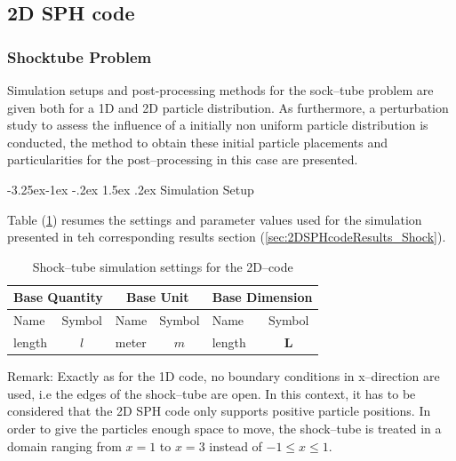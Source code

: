 \documentclass{report}
\makeatletter
\renewcommand\paragraph{\@startsection{paragraph}{4}{\z@}%
  {-3.25ex\@plus -1ex \@minus -.2ex}%
  {1.5ex \@plus .2ex}%
  {\normalfont\normalsize\bfseries}}
\makeatother
\begin{document}


\subsection{2D SPH code}
\label{sec:2DSPHcodeGeneralTestCaseIntroduction}

\subsubsection{Shocktube Problem}
\label{sec:2Dshock_simuSetup&Co}
Simulation setups and post-processing methods for the sock--tube problem are given both for a 1D and 2D particle distribution. As furthermore, a perturbation study to assess the influence of a initially non uniform particle distribution is conducted, the method to obtain these initial particle placements and particularities for the post--processing in this case are presented. 

\paragraph{Simulation Setup}

Table (\ref{tab:SimuSettings_Shock}) resumes the settings and parameter values used for the simulation presented in teh corresponding results section (\ref{sec:2DSPHcodeResults_Shock}). 



\begin{table}[h] %
\label{tab:SimuSettings_Shock}
\centering

\begin{tabular}[c]{|l c|l c|l c|} %
\hline
\hline
\multicolumn{2}{|c|}{\textbf{Base Quantity}} & \multicolumn{2}{|c|}{\textbf{Base Unit}} & \multicolumn{2}{|c|}{\textbf{Base Dimension}}\\
\hline
Name & Symbol & Name & Symbol & Name & Symbol\\
\hline
\hline
length & $l$ & meter & $m$ & length & {\bf L}\\

\hline
\hline
\end{tabular}
\caption[]{Shock--tube simulation settings for the 2D--code}

\end{table}
Remark: Exactly as for the 1D code, no boundary conditions in x--direction are used, i.e the edges of the shock--tube are open. In this context, it has to be considered that the 2D SPH code only supports positive particle positions. In order to give the particles enough space to move, the shock--tube is treated in a domain ranging from $x=1$ to $x=3$ instead of $-1\leq x\leq1$. 
\end{document}
